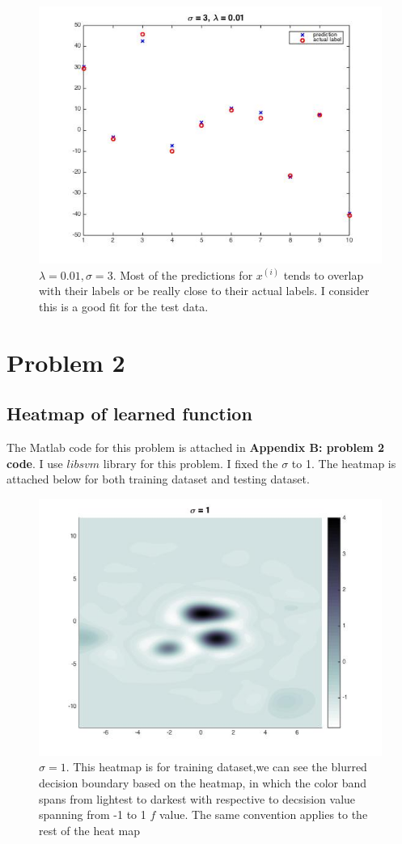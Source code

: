 \documentclass[twoside]{article}
\theoremstyle{definition}
\theoremstyle{definition}
\theoremstyle{remark}
\begin{document}
\begin{figure}[H]
\centering
\includegraphics[width=120mm]{problem1Pic6.jpg}
\caption{ $\lambda =0.01, \sigma = 3$.  Most of the predictions for $x^{(i)}$ tends to overlap with their labels or be really close to their actual labels. I consider this is a good fit for the test data. \label{problem1Pic2}}
\end{figure}

\section{Problem 2}
\subsection{Heatmap of learned function}
The Matlab code for this problem is attached in \textbf{Appendix B: problem 2 code}. I use $libsvm$ library for this problem. I fixed the $\sigma$ to 1. The heatmap is attached below for both training dataset and testing dataset.
  
\begin{figure}[H]
\centering
\includegraphics[width=120mm]{sigma_1.jpg}
\caption{ $\sigma = 1$. This heatmap is for training dataset,we can see the blurred decision boundary based on the heatmap, in which the color band spans from lightest to darkest with respective to decsision value spanning from -1 to 1 $f$ value. The same convention applies to the rest of the heat map\label{problem2Pic1}}
\end{figure}
\end{document}

